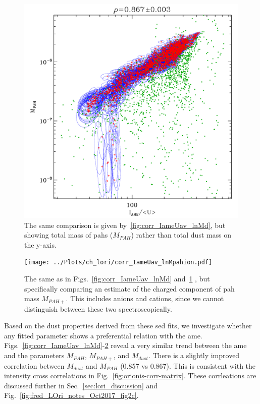               \begin{figure}
                \includegraphics[width=\textwidth]{../Plots/ch_lori/corr_IameUav_lnMpah.pdf}
                \centering
                \caption{The same comparison is given by~\ref{fig:corr_IameUav_lnMd}, but showing total mass of \acrshort{pah}s ($M_{PAH}$) rather than total dust mass on the y-axis. }
                \label{fig:corr_IameUav_lnMpah}
              \end{figure}
              \begin{figure}
                \texttt{[image: ../Plots/ch\_lori/corr\_IameUav\_lnMpahion.pdf]}
                \centering
                \caption{ The same as in Figs.~\ref{fig:corr_IameUav_lnMd} and~\ref{fig:corr_IameUav_lnMpah} , but specifically comparing an estimate of the charged component of \acrshort{pah} mass $M_{PAH+}$. This includes anions and cations, since we cannot distinguish between these two spectroscopically.}
                \label{fig:corr_IameUav_lnMpahion}
              \end{figure}
    Based on the dust properties derived from these \acrshort{sed} fits, we investigate whether any fitted parameter shows a preferential relation with the \acrshort{ame}. Figs.~\ref{fig:corr_IameUav_lnMd}-\ref{fig:corr_IameUav_lnMpahion} reveal a very similar trend between the \acrshort{ame} and the parameters $M_{PAH}$, $M_{PAH+}$, and $M_{dust}$. There is a slightly improved correlation between $M_{dust}$ and $M_{PAH}$ (0.857 vs 0.867). This is consistent with the intensity cross correlations in Fig.~\ref{fig:orionis-corr-matrix}. These corrleations are discussed further in Sec.~\ref{sec:lori_discussion} and Fig.~\ref{fig:fred_LOri_notes_Oct2017_fig2c}.

